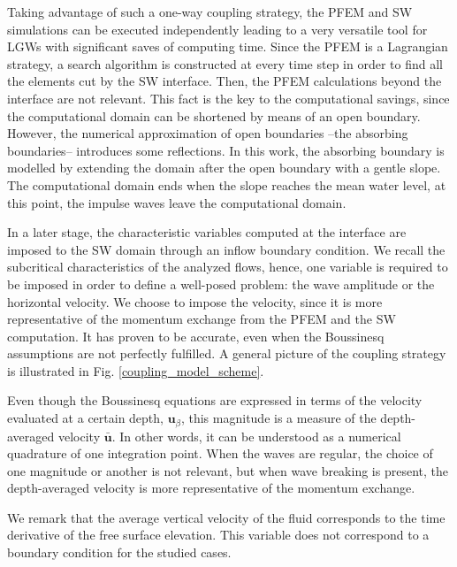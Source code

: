 Taking advantage of such a one-way coupling strategy, the PFEM and SW simulations can be executed independently leading to a very versatile tool for LGWs with significant saves of computing time.
Since the PFEM is a Lagrangian strategy, a search algorithm is constructed at every time step in order to find all the elements cut by the SW interface.
Then, the PFEM calculations beyond the interface are not relevant. This fact is the key to the computational savings, since the computational domain can be shortened by means of an open boundary. However, the numerical approximation of open boundaries --the absorbing boundaries-- introduces some reflections. In this work, the absorbing boundary is 
modelled by extending the domain after the open boundary with a gentle slope. The computational domain ends when the slope reaches the mean water level, at this point, the impulse waves leave the computational domain.

In a later stage, the characteristic variables computed at the interface are imposed to the SW domain through an inflow boundary condition. We recall the subcritical characteristics of the analyzed flows, hence, one variable is required to be imposed in order to define a well-posed problem: the wave amplitude or the horizontal velocity. 
We choose to impose the velocity, since it is more representative of the momentum exchange from the PFEM and the SW computation. It has proven to be accurate, even when the Boussinesq assumptions are not perfectly fulfilled.
A general picture of the coupling strategy is illustrated in Fig. \ref{coupling_model_scheme}.

Even though the Boussinesq equations are expressed in terms of the velocity evaluated at a certain depth, $\mathbf{u}_\beta$, this magnitude is a measure of the depth-averaged velocity $\bar{\mathbf{u}}$. In other words, it can be understood as a numerical quadrature of one integration point. When the waves are regular, the choice of one magnitude or another is not relevant, but when wave breaking is present, the depth-averaged velocity is more representative of the momentum exchange.

We remark that the average vertical velocity of the fluid corresponds to the time derivative of the free surface elevation. This variable does not correspond to a boundary condition for the studied cases.

